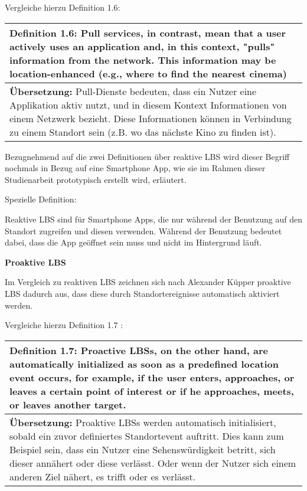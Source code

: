 Vergleiche hierzu Definition 1.6:

\begin{table}[h]
	\centering
	\begin{tabular}{|p{16cm}|}\hline
		\textbf{Definition 1.6:} \glqq Pull services, in contrast, mean that a user actively uses an application and, in this context, "pulls" information from the network. This information may be location-enhanced (e.g., where to find the nearest cinema) \grqq \cite[S.20]{Schiller2004} \\ \hline
		\textbf{Übersetzung:} Pull-Dienste bedeuten, dass ein Nutzer eine Applikation aktiv nutzt, und in diesem Kontext Informationen von einem Netzwerk bezieht. Diese Informationen können in Verbindung zu einem Standort sein (z.B. wo das nächste Kino zu finden ist). \\ \hline
	\end{tabular}
\end{table}

Bezugnehmend auf die zwei Definitionen über reaktive LBS wird dieser Begriff nochmals in Bezug auf eine Smartphone App, wie sie im Rahmen dieser Studienarbeit prototypisch erstellt wird, erläutert.

Spezielle Definition: 

Reaktive LBS sind für Smartphone Apps, die nur während der Benutzung auf den Standort zugreifen und diesen verwenden. Während der Benutzung bedeutet dabei, dass die App geöffnet sein muss und nicht im Hintergrund läuft.


\textbf{Proaktive LBS}

Im Vergleich zu reaktiven LBS zeichnen sich nach Alexander Küpper proaktive LBS dadurch aus, dass diese durch Standortereignisse automatisch aktiviert werden.

Vergleiche hierzu Definition 1.7 :

\begin{table}[h]
	\centering
	\begin{tabular}{|p{16cm}|}\hline
		\textbf{Definition 1.7:} \glqq Proactive LBSs, on the other hand, are automatically initialized as soon as a predefined location event occurs, for example, if the user enters, approaches, or leaves a certain point of interest or if he approaches, meets, or leaves another target. \grqq \cite[S.3]{Kuepper2005} \\ \hline
		\textbf{Übersetzung:} Proaktive LBSs werden automatisch initialisiert, sobald ein zuvor definiertes Standortevent auftritt. Dies kann zum Beispiel sein, dass ein Nutzer eine Sehenswürdigkeit betritt, sich dieser annähert oder diese verlässt. Oder wenn der Nutzer sich einem anderen Ziel nähert, es trifft oder es verlässt. \\ \hline
	\end{tabular}
\end{table}


